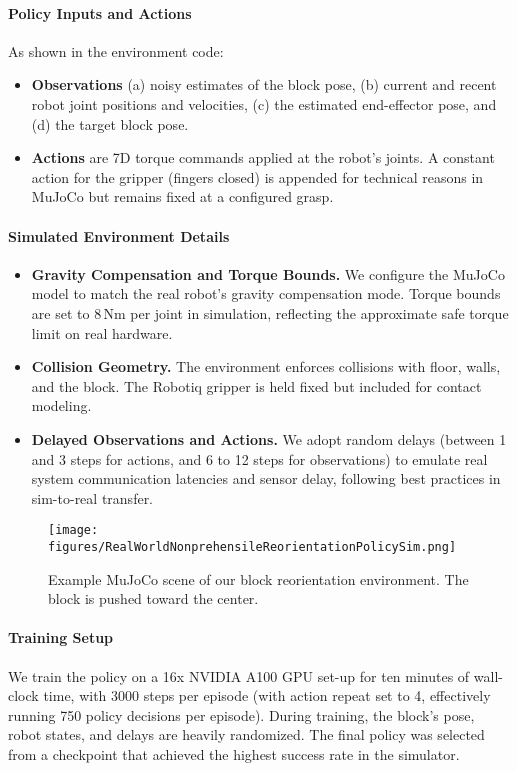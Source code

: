 \paragraph{Policy Inputs and Actions} As shown in the environment code:
\begin{itemize}[leftmargin=1em]
    \item \textbf{Observations} (a) noisy estimates of the block pose, (b) current and recent robot joint positions and velocities, (c) the estimated end-effector pose, and (d) the target block pose.  
    \item \textbf{Actions} are 7D torque commands applied at the robot's joints. A constant action for the gripper (fingers closed) is appended for technical reasons in MuJoCo but remains fixed at a configured grasp.
\end{itemize}

\paragraph{Simulated Environment Details}  
\begin{itemize}[leftmargin=1em]
    \item \textbf{Gravity Compensation and Torque Bounds.} We configure the MuJoCo model to match the real robot's gravity compensation mode. Torque bounds are set to $8\,\mathrm{Nm}$ per joint in simulation, reflecting the approximate safe torque limit on real hardware.  
    \item \textbf{Collision Geometry.} The environment enforces collisions with floor, walls, and the block. The Robotiq gripper is held fixed but included for contact modeling.  
    \item \textbf{Delayed Observations and Actions.} We adopt random delays (between 1 and 3 steps for actions, and 6 to 12 steps for observations) to emulate real system communication latencies and sensor delay, following best practices in sim-to-real transfer.  
\end{itemize}

\begin{figure}[t]
    \centering
    \texttt{[image: figures/RealWorldNonprehensileReorientationPolicySim.png]}
    \caption{\small Example MuJoCo scene of our block reorientation environment. The block is pushed toward the center.}
    \label{fig:panda-robotiq-sim-env}
\end{figure}

\paragraph{Training Setup}  
We train the policy on a 16x NVIDIA A100 GPU set-up for ten minutes of wall-clock time, with 3000 steps per episode (with action repeat set to 4, effectively running 750 policy decisions per episode). During training, the block's pose, robot states, and delays are heavily randomized. The final policy was selected from a checkpoint that achieved the highest success rate in the simulator.  

